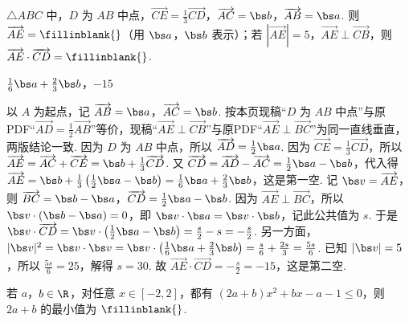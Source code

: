 \documentclass[UTF8,a4paper,oneside,11pt]{ctexbook}
\begin{document}
\begin{problem}
\(\triangle ABC\) 中，\(D\) 为 \(AB\) 中点，\(\overrightarrow{CE}=\frac13\overrightarrow{CD}\)，\(\overrightarrow{AC}= \bs b\)，\(\overrightarrow{AB}=\bs a\).
则 \(\overrightarrow{AE}=\fillinblank{}\)（用 \(\bs a\)，\(\bs b\) 表示）；若 \(|\overrightarrow{AE}|=5\)，\(\overrightarrow{AE}\perp\overrightarrow{CB}\)，则 \(\overrightarrow{AE}\cdot\overrightarrow{CD}=\fillinblank{}\).

\end{problem}

\begin{answer}
\(\frac16\bs a+\frac23\bs b\)，\(-15\)
\end{answer}

\begin{solution}
以 \(A\) 为起点，记 \(\overrightarrow{AB}=\bs a\)，\(\overrightarrow{AC}=\bs b\). 按本页现稿“\(D\) 为 \(AB\) 中点”与原PDF“\(\overrightarrow{AD}=\frac12\overrightarrow{AB}\)”等价，现稿“\(\overrightarrow{AE}\perp\overrightarrow{CB}\)”与原PDF“\(\overrightarrow{AE}\perp\overrightarrow{BC}\)”为同一直线垂直，两版结论一致. 因为 \(D\) 为 \(AB\) 中点，所以 \(\overrightarrow{AD}=\frac12\bs a\). 因为 \(\overrightarrow{CE}=\frac13\overrightarrow{CD}\)，所以 \(\overrightarrow{AE}=\overrightarrow{AC}+\overrightarrow{CE}=\bs b+\frac13\overrightarrow{CD}\). 又 \(\overrightarrow{CD}=\overrightarrow{AD}-\overrightarrow{AC}=\frac12\bs a-\bs b\)，代入得 \(\overrightarrow{AE}=\bs b+\frac13\left(\frac12\bs a-\bs b\right)=\frac16\bs a+\frac23\bs b\)，这是第一空. 记 \(\bs v=\overrightarrow{AE}\)，则 \(\overrightarrow{BC}=\bs b-\bs a\)，\(\overrightarrow{CD}=\frac12\bs a-\bs b\). 因为 \(\overrightarrow{AE}\perp \overrightarrow{BC}\)，所以 \(\bs v\cdot(\bs b-\bs a)=0\)，即 \(\bs v\cdot\bs a=\bs v\cdot\bs b\)，记此公共值为 \(s\). 于是 \(\bs v\cdot\overrightarrow{CD}=\bs v\cdot\left(\frac12\bs a-\bs b\right)=\frac{s}{2}-s=-\frac{s}{2}\). 另一方面，\(|\bs v|^{2}=\bs v\cdot\bs v=\bs v\cdot\left(\frac16\bs a+\frac23\bs b\right)=\frac{s}{6}+\frac{2s}{3}=\frac{5s}{6}\). 已知 \(|\bs v|=5\)，所以 \(\frac{5s}{6}=25\)，解得 \(s=30\). 故 \(\overrightarrow{AE}\cdot\overrightarrow{CD}=-\frac{s}{2}=-15\)，这是第二空.
\end{solution}

\begin{problem}
若 \(a\)，\(b\in\R\)，对任意 \(x\in[-2,2]\)，都有 \((2a+b)x^2+bx-a-1\le0\)，则 \(2a+b\) 的最小值为 \(\fillinblank{}\).
\end{problem}
\end{document}
